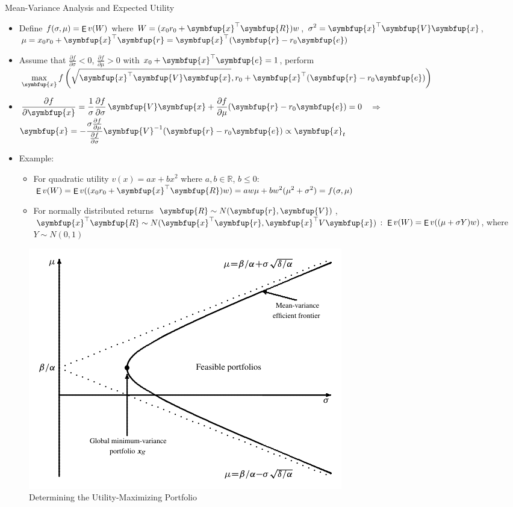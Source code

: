 \documentclass[10pt]{beamer}
\newcommand{\ds}{\displaystyle}
\newcommand{\ie}{\;\Longrightarrow\;}
\newcommand{\vx}{\symbfup{x}}
\newcommand{\vR}{\symbfup{R}}
\newcommand{\vV}{\symbfup{V}}
\newcommand{\ve}{\symbfup{e}}
\newcommand{\vr}{\symbfup{r}}
\DeclareMathOperator\expc{{\sf E}}
\theoremstyle{definition}
\begin{document}
\begin{frame}{Mean-Variance Analysis and Expected Utility}
  \begin{itemize}[<+->]
    \item Define $\ds f(\sigma,\mu) = \expc v(W)$ where $\ds W = (x_0 r_0 + \vx^\top\vR)w$, $\ds\sigma^2 = \vx^\top\vV\vx$, $\ds\mu = x_0 r_0 + \vx^\top\vr = \vx^\top(\vr - r_0\ve)$  
    \item Assume that $\ds\frac{\partial f}{\partial\sigma} < 0$, $\ds\frac{\partial f}{\partial\mu} > 0$ with $x_0 + \vx^\top\ve = 1$, perform $\ds\max_{\vx}f\left(\sqrt{\vx^\top\vV\vx}, r_0 + \vx^\top(\vr - r_0\ve)\right)$
    \item $\ds\frac{\partial f}{\partial\vx} = \frac{1}{\sigma}\frac{\partial f}{\partial\sigma}\,\vV\vx + \frac{\partial f}{\partial\mu}(\vr - r_0\ve) = 0$ $\ie$ $\ds\vx = -\frac{\sigma\frac{\partial f}{\partial\mu}}{\frac{\partial f}{\partial\sigma}}\vV^{-1}(\vr - r_0\ve)\propto\vx_t$
    \item Example:
      \begin{itemize}
        \item For quadratic utility $\ds v(x) = ax + bx^2$ where $a, b\in\mathbb{R}$, $b\leqslant 0$: $\ds\expc v(W) = \expc v((x_0 r_0 + \vx^\top\vR)w) = aw\mu + bw^2(\mu^2 + \sigma^2) = f(\sigma, \mu)$
        \item For normally distributed returns $\ds\vR\sim N(\vr, \vV)$, $\ds\vx^\top\vR\sim N(\vx^\top\vr, \vx^\top V\vx)$: $\ds\expc v(W) = \expc v((\mu + \sigma Y) w)$, where $\ds Y\sim N(0, 1)$ 
      \end{itemize}
  \end{itemize}
\end{frame}

\begin{frame}
\begin{figure}[!htbp]
  \centering
  \includegraphics[scale=1.1,page=4]{fig/sfm.pdf}
  \caption{Determining the Utility-Maximizing Portfolio}
  \label{fig:mv4}
\end{figure}
\end{frame}
\end{document}
